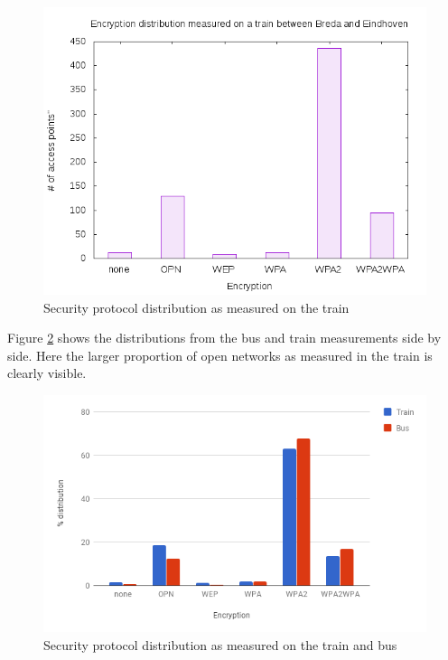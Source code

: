 \documentclass[letterpaper, 10 pt, conference]{ieeeconf}  %
\begin{document}
\begin{figure}[h]
\includegraphics[scale=0.5]{Figures/TrainEncryptionCount.png}
\caption{Security protocol distribution as measured on the train}
\label{fig:trainencdist}
\end{figure}

Figure \ref{fig:encdist} shows the distributions from the bus and train measurements side by side. Here the larger proportion of open networks as measured in the train is clearly visible.

\begin{figure}[h]
\includegraphics[scale=0.4]{Figures/EncryptionDist.png}
\caption{Security protocol distribution as measured on the train and bus}
\label{fig:encdist}
\end{figure}
\end{document}
